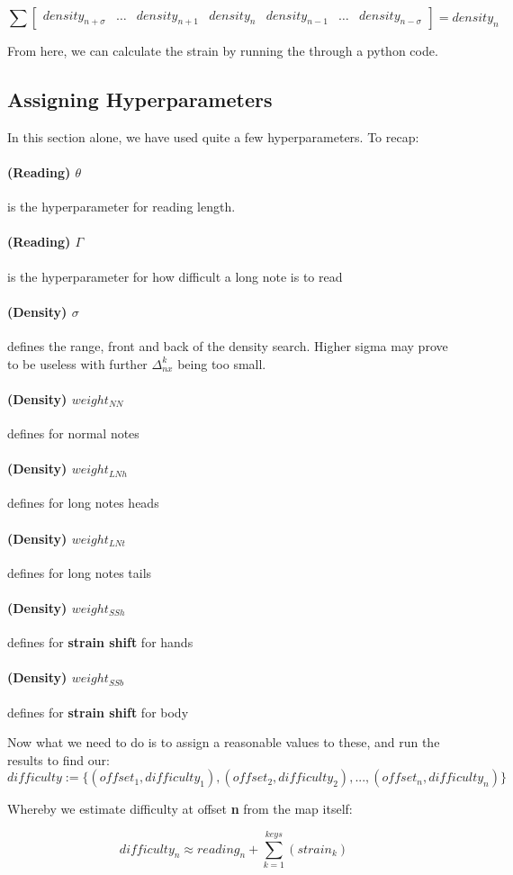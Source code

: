 $$ \sum
\begin{bmatrix}
	density_{n+\sigma} & \dots & density_{n+1} & density_{n} & density_{n-1} & \dots & density_{n-\sigma} 
\end{bmatrix}
= density_n
$$ 

From here, we can calculate the strain by running the through a python code.

\subsection{Assigning Hyperparameters}

In this section alone, we have used quite a few hyperparameters. To recap:

\paragraph{(Reading) $\theta$} is the hyperparameter for reading length.
\paragraph{(Reading) $\Gamma$} is the hyperparameter for how difficult a long note is to read

\paragraph{(Density) $\sigma$} defines the range, front and back of the density search. Higher sigma may prove to be useless with further $\Delta_{nx}^k$ being too small.

\paragraph{(Density) $weight_{NN}$} defines for normal notes
\paragraph{(Density) $weight_{LNh}$} defines for long notes heads
\paragraph{(Density) $weight_{LNt}$} defines for long notes tails
\paragraph{(Density) $weight_{SSh}$} defines for \textbf{strain shift} for hands
\paragraph{(Density) $weight_{SSb}$} defines for \textbf{strain shift} for body 

Now what we need to do is to assign a reasonable values to these, and run the results to find our:
$$ difficulty := \lbrace(offset_1, difficulty_1), (offset_2, difficulty_2), ..., (offset_n, difficulty_n)\rbrace $$

Whereby we estimate difficulty at offset \textbf{n} from the map itself:

$$ difficulty_n \approx reading_n + \sum_{k=1}^{keys} \left(strain_k \right) $$


